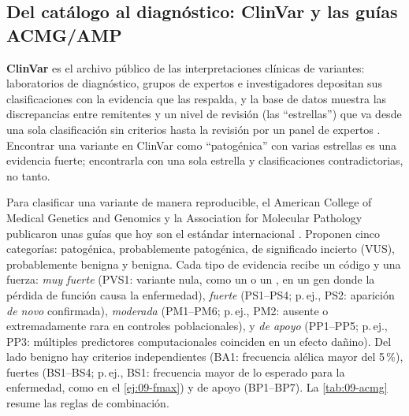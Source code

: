 \subsection{Del catálogo al diagnóstico: ClinVar y las guías ACMG/AMP}

\textbf{ClinVar} es el archivo público de las interpretaciones clínicas de variantes: laboratorios de diagnóstico, grupos de expertos e investigadores depositan sus clasificaciones con la evidencia que las respalda, y la base de datos muestra las discrepancias entre remitentes y un nivel de revisión (las ``estrellas'') que va desde una sola clasificación sin criterios hasta la revisión por un panel de expertos \parencite{c09-landrum2018}. Encontrar una variante en ClinVar como ``patogénica'' con varias estrellas es una evidencia fuerte; encontrarla con una sola estrella y clasificaciones contradictorias, no tanto.

Para clasificar una variante de manera reproducible, el American College of Medical Genetics and Genomics y la Association for Molecular Pathology publicaron unas guías que hoy son el estándar internacional \parencite{c09-richards2015}. Proponen cinco categorías: patogénica, probablemente patogénica, de significado incierto (VUS), probablemente benigna y benigna. Cada tipo de evidencia recibe un código y una fuerza: \emph{muy fuerte} (PVS1: variante nula, como un  o un , en un gen donde la pérdida de función causa la enfermedad), \emph{fuerte} (PS1--PS4; p.\,ej., PS2: aparición \emph{de novo} confirmada), \emph{moderada} (PM1--PM6; p.\,ej., PM2: ausente o extremadamente rara en controles poblacionales), y \emph{de apoyo} (PP1--PP5; p.\,ej., PP3: múltiples predictores computacionales coinciden en un efecto dañino). Del lado benigno hay criterios independientes (BA1: frecuencia alélica mayor del 5\,\%), fuertes (BS1--BS4; p.\,ej., BS1: frecuencia mayor de lo esperado para la enfermedad, como en el \cref{ej:09-fmax}) y de apoyo (BP1--BP7). La \cref{tab:09-acmg} resume las reglas de combinación.

